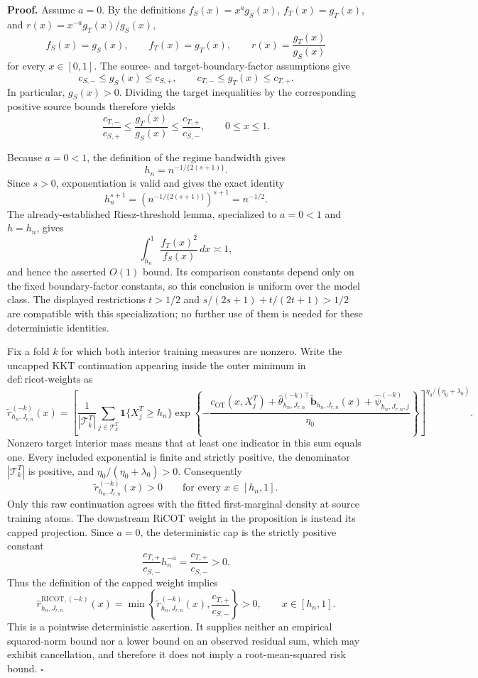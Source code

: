 \textbf{Proof.}
Assume \(a=0\).  By the definitions \(f_S(x)=x^a g_S(x)\), \(f_T(x)=g_T(x)\), and \(r(x)=x^{-a}g_T(x)/g_S(x)\),
\[
f_S(x)=g_S(x),\qquad f_T(x)=g_T(x),\qquad r(x)=\frac{g_T(x)}{g_S(x)}
\]
for every \(x\in[0,1]\).  The source- and target-boundary-factor assumptions give
\[
c_{S,-}\le g_S(x)\le c_{S,+},
\qquad
c_{T,-}\le g_T(x)\le c_{T,+}.
\]
In particular, \(g_S(x)>0\).  Dividing the target inequalities by the corresponding positive source bounds therefore yields
\[
\frac{c_{T,-}}{c_{S,+}}
\le \frac{g_T(x)}{g_S(x)}
\le \frac{c_{T,+}}{c_{S,-}},
\qquad 0\le x\le1.
\]

Because \(a=0<1\), the definition of the regime bandwidth gives
\[
h_n=n^{-1/\{2(s+1)\}}.
\]
Since \(s>0\), exponentiation is valid and gives the exact identity
\[
h_n^{s+1}=\left(n^{-1/\{2(s+1)\}}\right)^{s+1}=n^{-1/2}.
\]
The already-established Riesz-threshold lemma, specialized to \(a=0<1\) and \(h=h_n\), gives
\[
\int_{h_n}^1\frac{f_T(x)^2}{f_S(x)}\,dx\asymp1,
\]
and hence the asserted \(O(1)\) bound.  Its comparison constants depend only on the fixed boundary-factor constants, so this conclusion is uniform over the model class.  The displayed restrictions \(t>1/2\) and \(s/(2s+1)+t/(2t+1)>1/2\) are compatible with this specialization; no further use of them is needed for these deterministic identities.

Fix a fold \(k\) for which both interior training measures are nonzero.  Write the uncapped KKT continuation appearing inside the outer minimum in \(\mathrm{def:ricot\text{-}weights}\) as
\[
\widetilde r^{(-k)}_{h_n,J_{r,n}}(x)
=
\left[
\frac1{|\mathcal T^T_k|}
\sum_{j\in\mathcal T^T_k}
\mathbf 1\{X_j^T\ge h_n\}
\exp\!\left\{-\frac{c_{\mathrm{OT}}(x,X_j^T)
+\widehat\theta_{h_n,J_{r,n}}^{(-k)\top}
\widetilde{\mathbf b}_{h_n,J_{r,n}}(x)
+\widehat\psi^{(-k)}_{h_n,J_{r,n},j}}
{\eta_0}\right\}
\right]^{\eta_0/(\eta_0+\lambda_0)}.
\]
Nonzero target interior mass means that at least one indicator in this sum equals one.  Every included exponential is finite and strictly positive, the denominator \(|\mathcal T^T_k|\) is positive, and \(\eta_0/(\eta_0+\lambda_0)>0\).  Consequently
\[
\widetilde r^{(-k)}_{h_n,J_{r,n}}(x)>0
\qquad\text{for every }x\in[h_n,1].
\]
Only this raw continuation agrees with the fitted first-marginal density at source training atoms.  The downstream RiCOT weight in the proposition is instead its capped projection.  Since \(a=0\), the deterministic cap is the strictly positive constant
\[
\frac{c_{T,+}}{c_{S,-}}h_n^{-a}=\frac{c_{T,+}}{c_{S,-}}>0.
\]
Thus the definition of the capped weight implies
\[
\widehat r^{\mathrm{RICOT},(-k)}_{h_n,J_{r,n}}(x)
=\min\!\left\{
\widetilde r^{(-k)}_{h_n,J_{r,n}}(x),
\frac{c_{T,+}}{c_{S,-}}
\right\}>0,
\qquad x\in[h_n,1].
\]
This is a pointwise deterministic assertion.  It supplies neither an empirical squared-norm bound nor a lower bound on an observed residual sum, which may exhibit cancellation, and therefore it does not imply a root-mean-squared risk bound. \(\square\)